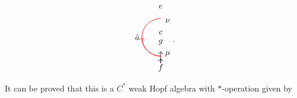 \documentclass[a4paper,11pt]{article}
\theoremstyle{theorem}
\theoremstyle{remark}
\begin{document}
\begin{equation}
\begin{aligned}
\begin{tikzpicture}
        \draw[line width=0.6pt,black,->] (0,-1.1)--(0,-0.9);
        \draw[line width=0.6pt,black,->] (0,-1.1)--(0,-0.6);
        \draw[red, line width=0.6pt] (0,0.8) arc[start angle=90, end angle=270, radius=0.8];
           \draw[red, line width=0.6pt, ->] (0,-0.8) arc[start angle=270, end angle=180, radius=0.8];
        \node[line width=0.6pt, dashed, draw opacity=0.5] at (0,1.3) {$e$};
        \node[line width=0.6pt, dashed, draw opacity=0.5] at (0,-1.3) {$f$};
        \node[line width=0.6pt, dashed, draw opacity=0.5] at (-1,0) {$\bar{a}$};
        \node[line width=0.6pt, dashed, draw opacity=0.5] at (0.3,-0.7) {$\mu$};
        \node[line width=0.6pt, dashed, draw opacity=0.5] at (0,-0.2) {$g$};
        \node[line width=0.6pt, dashed, draw opacity=0.5] at (0,0.2) {$c$};
        \node[line width=0.6pt, dashed, draw opacity=0.5] at (0.3,0.7) {$\nu$};
    \end{tikzpicture}
\end{aligned}.
\end{equation}
It can be proved that this is a \( C^* \) weak Hopf algebra \cite{jia2024weakTube} with $*$-operation given by
\end{document}

